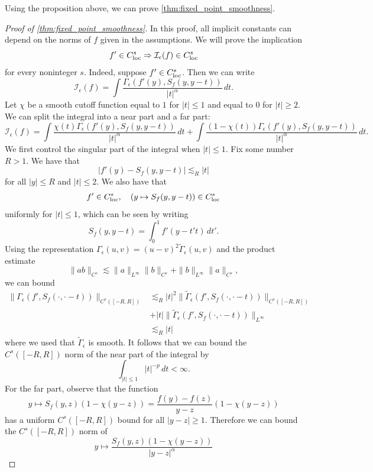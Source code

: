 \documentclass[11pt]{amsart}
\theoremstyle{definition}
\theoremstyle{remark}
\numberwithin{equation}{section}
\newcommand{\sq}[1]{\widetilde{#1}}
\newcommand{\mc}[1]{\mathcal{#1}}
\begin{document}
Using the proposition above, we can prove \cref{thm:fixed_point_smoothness}.

\begin{proof}[Proof of \cref{thm:fixed_point_smoothness}]
    In this proof, all implicit constants can depend on the norms of $f$ given in the assumptions. We will prove the implication
    \[f' \in C^s_{\textup{loc}} \Rightarrow \mc{I}_\epsilon(f) \in C^s_{\textup{loc}}\]
    for every noninteger $s$. Indeed, suppose $f' \in C_{\textup{loc}}^s$. Then we can write
    \[\mc{I}_\epsilon(f) = \int \frac{\Gamma_\epsilon(f'(y), S_f(y, y - t))}{|t|^{\alpha}}\,dt.\]
    Let $\chi$ be a smooth cutoff function equal to $1$ for $|t| \leq 1$ and equal to $0$ for $|t| \geq 2$. We can split the integral into a near part and a far part:
    \[\mc{I}_\epsilon(f) = \int \frac{\chi(t)\Gamma_\epsilon(f'(y), S_f(y, y - t))}{|t|^{\alpha}}\,dt + \int \frac{(1 - \chi(t))\Gamma_\epsilon(f'(y), S_f(y, y - t))}{|t|^{\alpha}}\,dt.\]
We first control the singular part of the integral when $|t| \leq 1$. Fix some number $R > 1$. We have that
    \[|f'(y) - S_{f}(y, y - t)| \lesssim_ R |t|\]
    for all $|y| \leq R$ and $|t| \leq 2$. We also have that 
    \[f' \in C_{\textup{loc}}^s, \quad (y \mapsto S_f(y, y - t)) \in C_{\textup{loc}}^s\]
    uniformly for $|t| \leq 1$, which can be seen by writing
    \[S_f(y, y - t) = \int_{0}^{1} f'(y - t't) \, dt'.\]
    Using the representation $\Gamma_\epsilon(u, v) = (u - v)^2\sq{\Gamma}_\epsilon(u, v)$ and the product estimate
    \[\|ab\|_{C^s} \lesssim \|a\|_{L^\infty} \|b\|_{C^s} + \|b\|_{L^\infty} \|a\|_{C^s},\]
    we can bound
    \begin{align*}
        \|\Gamma_\epsilon(f', S_f(\cdot, \cdot - t))\|_{C^s([-R,R])} & \lesssim_R |t|^2 \|\sq{\Gamma}_\epsilon(f', S_f(\cdot, \cdot - t))\|_{C^s([-R,R])} \\
        & + |t|\|\sq{\Gamma}_\epsilon(f', S_f(\cdot, \cdot - t))\|_{L^\infty} \\
        & \lesssim_R |t|
    \end{align*}
    where we used that $\sq{\Gamma}_\epsilon$ is smooth. It follows that we can bound the $C^s([-R,R])$ norm of the near part of the integral by 
    \[\int_{|t| \leq 1}|t|^{-p} \, dt < \infty.\]
    For the far part, observe that the function 
    \[y \mapsto S_f(y, z)(1 - \chi(y - z)) = \frac{f(y) - f(z)}{y - z}(1 - \chi(y - z))\]
    has a uniform $C^s([-R,R])$ bound for all $|y - z| \geq 1$. Therefore we can bound the $C^s([-R,R])$ norm of 
    \[y \mapsto \frac{S_f(y, z)(1 - \chi(y - z))}{|y - z|^\alpha}\]

\end{proof}
\end{document}
